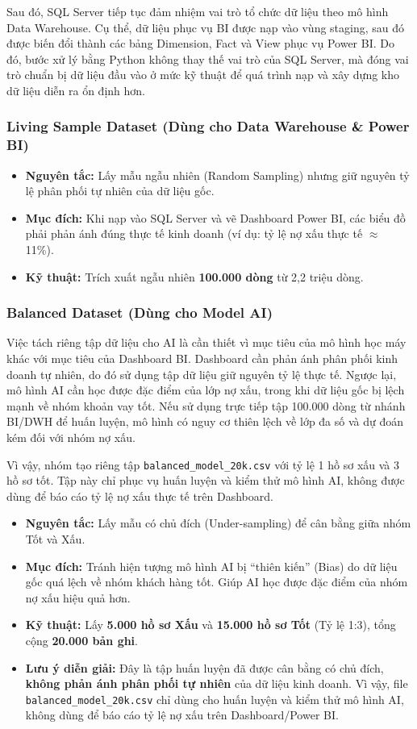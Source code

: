 Sau đó, SQL Server tiếp tục đảm nhiệm vai trò tổ chức dữ liệu theo mô hình Data Warehouse. Cụ thể, dữ liệu phục vụ BI được nạp vào vùng staging, sau đó được biến đổi thành các bảng Dimension, Fact và View phục vụ Power BI. Do đó, bước xử lý bằng Python không thay thế vai trò của SQL Server, mà đóng vai trò chuẩn bị dữ liệu đầu vào ở mức kỹ thuật để quá trình nạp và xây dựng kho dữ liệu diễn ra ổn định hơn.
\subsubsection{Living Sample Dataset (Dùng cho Data Warehouse \& Power BI)}
\begin{itemize}
    \item \textbf{Nguyên tắc:} Lấy mẫu ngẫu nhiên (Random Sampling) nhưng giữ nguyên tỷ lệ phân phối tự nhiên của dữ liệu gốc.
    \item \textbf{Mục đích:} Khi nạp vào SQL Server và vẽ Dashboard Power BI, các biểu đồ phải phản ánh đúng thực tế kinh doanh (ví dụ: tỷ lệ nợ xấu thực tế $\approx$ 11\%).
    \item \textbf{Kỹ thuật:} Trích xuất ngẫu nhiên \textbf{100.000 dòng} từ 2,2 triệu dòng.
\end{itemize}

\subsubsection{Balanced Dataset (Dùng cho Model AI)}
Việc tách riêng tập dữ liệu cho AI là cần thiết vì mục tiêu của mô hình học máy khác với mục tiêu của Dashboard BI. Dashboard cần phản ánh phân phối kinh doanh tự nhiên, do đó sử dụng tập dữ liệu giữ nguyên tỷ lệ thực tế. Ngược lại, mô hình AI cần học được đặc điểm của lớp nợ xấu, trong khi dữ liệu gốc bị lệch mạnh về nhóm khoản vay tốt. Nếu sử dụng trực tiếp tập 100.000 dòng từ nhánh BI/DWH để huấn luyện, mô hình có nguy cơ thiên lệch về lớp đa số và dự đoán kém đối với nhóm nợ xấu.

Vì vậy, nhóm tạo riêng tập \texttt{balanced\_model\_20k.csv} với tỷ lệ 1 hồ sơ xấu và 3 hồ sơ tốt. Tập này chỉ phục vụ huấn luyện và kiểm thử mô hình AI, không được dùng để báo cáo tỷ lệ nợ xấu thực tế trên Dashboard.
\begin{itemize}
    \item \textbf{Nguyên tắc:} Lấy mẫu có chủ đích (Under-sampling) để cân bằng giữa nhóm Tốt và Xấu.
    \item \textbf{Mục đích:} Tránh hiện tượng mô hình AI bị ``thiên kiến'' (Bias) do dữ liệu gốc quá lệch về nhóm khách hàng tốt. Giúp AI học được đặc điểm của nhóm nợ xấu hiệu quả hơn.
    \item \textbf{Kỹ thuật:} Lấy \textbf{5.000 hồ sơ Xấu} và \textbf{15.000 hồ sơ Tốt} (Tỷ lệ 1:3), tổng cộng \textbf{20.000 bản ghi}.
    \item \textbf{Lưu ý diễn giải:} Đây là tập huấn luyện đã được cân bằng có chủ đích, \textbf{không phản ánh phân phối tự nhiên} của dữ liệu kinh doanh. Vì vậy, file \texttt{balanced\_model\_20k.csv} chỉ dùng cho huấn luyện và kiểm thử mô hình AI, không dùng để báo cáo tỷ lệ nợ xấu trên Dashboard/Power BI.
\end{itemize}

